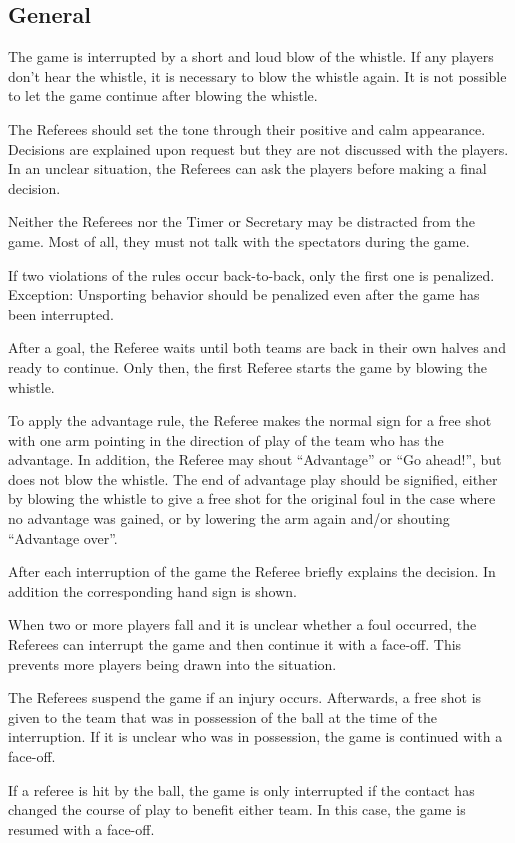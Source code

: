 \subsection{General}
The game is interrupted by a short and loud blow of the whistle.
If any players don't hear the whistle, it is necessary to blow the whistle again.
It is not possible to let the game continue after blowing the whistle.

The Referees should set the tone through their positive and calm appearance.
Decisions are explained upon request but they are not discussed with the players.
In an unclear situation, the Referees can ask the players before making a final decision.

Neither the Referees nor the Timer or Secretary may be distracted from the game.
Most of all, they must not talk with the spectators during the game.

If two violations of the rules occur back-to-back, only the first one is penalized.
Exception: Unsporting behavior should be penalized even after the game has been interrupted.

After a goal, the Referee waits until both teams are back in their own halves and ready to continue.
Only then, the first Referee starts the game by blowing the whistle.

To apply the advantage rule, the Referee makes the normal sign for a free shot with one arm pointing in the direction of play of the team who has the advantage.
In addition, the Referee may shout ``Advantage'' or ``Go ahead!'', but does not blow the whistle.
The end of advantage play should be signified, either by blowing the whistle to give a free shot for the original foul in the case where no advantage was gained, or by lowering the arm again and/or shouting ``Advantage over''.

After each interruption of the game the Referee briefly explains the decision.
In addition the corresponding hand sign is shown.

When two or more players fall and it is unclear whether a foul occurred, the Referees can interrupt the game and then continue it with a face-off.
This prevents more players being drawn into the situation.

The Referees suspend the game if an injury occurs.
Afterwards, a free shot is given to the team that was in possession of the ball at the time of the interruption.
If it is unclear who was in possession, the game is continued with a face-off.

If a referee is hit by the ball, the game is only interrupted if the contact has changed the course of play to benefit either team.
In this case, the game is resumed with a face-off.

